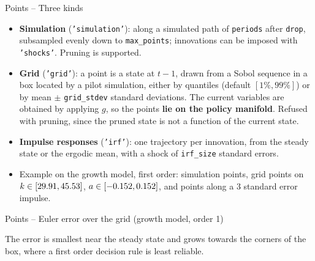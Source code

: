 \documentclass[11pt,aspectratio=169]{beamer}
\newcommand{\code}[1]{\texttt{#1}}
\begin{document}
\begin{frame}{Points -- Three kinds}

\begin{itemize}

\item \textbf{Simulation} (\code{'simulation'}): along a simulated path of \code{periods} after \code{drop}, subsampled evenly down to \code{max\_points}; innovations can be imposed with \code{'shocks'}. Pruning is supported.\newline

\item \textbf{Grid} (\code{'grid'}): a point is a state at $t-1$, drawn from a Sobol sequence in a box located by a pilot simulation, either by quantiles (default $[1\%,99\%]$) or by mean $\pm$ \code{grid\_stdev} standard deviations. The current variables are obtained by applying $g$, so the points \textbf{lie on the policy manifold}. Refused with pruning, since the pruned state is not a function of the current state.\newline

\item \textbf{Impulse responses} (\code{'irf'}): one trajectory per innovation, from the steady state or the ergodic mean, with a shock of \code{irf\_size} standard errors.\newline

\item Example on the growth model, first order: \growthSimPoints{} simulation points, \growthGridPoints{} grid points on $k\in[29.91,45.53]$, $a\in[-0.152,0.152]$, and \growthIrfPoints{} points along a 3 standard error impulse.

\end{itemize}

\end{frame}

\begin{frame}{Points -- Euler error over the grid (growth model, order 1)}

\begin{center}
\end{center}

\vspace*{-0.2cm}
The error is smallest near the steady state and grows towards the corners of the box, where a first order decision rule is least reliable.

\end{frame}
\end{document}
